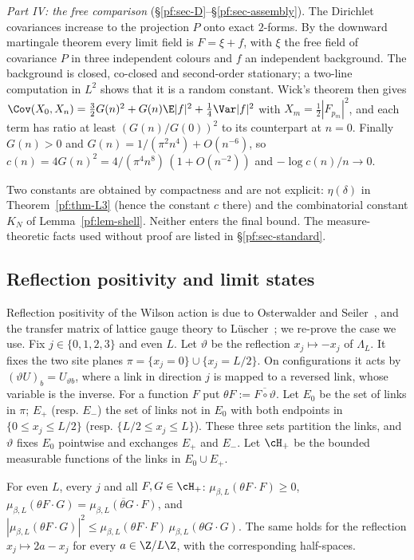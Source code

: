 \emph{Part IV: the free comparison} (\S\ref{pf:sec-D}--\S\ref{pf:sec-assembly}). The Dirichlet covariances increase to the projection $P$ onto exact $2$-forms. By the downward martingale theorem every limit field is $F=\xi+f$, with $\xi$ the free field of covariance $P$ in three independent colours and $f$ an independent background. The background is closed, co-closed and second-order stationary; a two-line computation in $L^2$ shows that it is a random constant. Wick's theorem then gives
$\Cov(X_0,X_n)=\tfrac32G(n)^2+G(n)\E|f|^2+\tfrac14\Var|f|^2$ with $X_m=\tfrac12|F_{p_m}|^2$, and each term has ratio at least $(G(n)/G(0))^2$ to its counterpart at $n=0$. Finally $G(n)>0$ and $G(n)=1/(\pi^2n^4)+O(n^{-6})$, so $c(n)=4G(n)^2=4/(\pi^4n^8)\,(1+O(n^{-2}))$ and $-\log c(n)/n\to0$.

Two constants are obtained by compactness and are not explicit: $\eta(\delta)$ in Theorem~\ref{pf:thm-L3} (hence the constant $c$ there) and the combinatorial constant $K_N$ of Lemma~\ref{pf:lem-shell}. Neither enters the final bound. The measure-theoretic facts used without proof are listed in \S\ref{pf:sec-standard}.

\subsection{Reflection positivity and limit states}\label{pf:sec-rp}

Reflection positivity of the Wilson action is due to Osterwalder and Seiler~\cite{OS78}, and the transfer matrix of lattice gauge theory to L\"uscher~\cite{Lu77}; we re-prove the case we use. Fix $j\in\{0,1,2,3\}$ and even $L$. Let $\vartheta$ be the reflection $x_j\mapsto-x_j$ of $\Lambda_L$. It fixes the two site planes $\pi=\{x_j=0\}\cup\{x_j=L/2\}$. On configurations it acts by $(\vartheta U)_{b}=U_{\vartheta b}$, where a link in direction $j$ is mapped to a reversed link, whose variable is the inverse. For a function $F$ put $\theta F:=\overline{F\circ\vartheta}$.
Let $E_0$ be the set of links in $\pi$; $E_+$ (resp. $E_-$) the set of links not in $E_0$ with both endpoints in $\{0\le x_j\le L/2\}$ (resp. $\{L/2\le x_j\le L\}$). These three sets partition the links, and $\vartheta$ fixes $E_0$ pointwise and exchanges $E_+$ and $E_-$. Let $\cH_+$ be the bounded measurable functions of the links in $E_0\cup E_+$.

\begin{lemma}\label{pf:lem-rp}
For even $L$, every $j$ and all $F,G\in\cH_+$: $\mu_{\beta,L}(\theta F\cdot F)\ge0$, $\mu_{\beta,L}(\theta F\cdot G)=\overline{\mu_{\beta,L}(\theta G\cdot F)}$, and $|\mu_{\beta,L}(\theta F\cdot G)|^2\le\mu_{\beta,L}(\theta F\cdot F)\,\mu_{\beta,L}(\theta G\cdot G)$. The same holds for the reflection $x_j\mapsto2a-x_j$ for every $a\in\Z/L\Z$, with the corresponding half-spaces.
\end{lemma}

